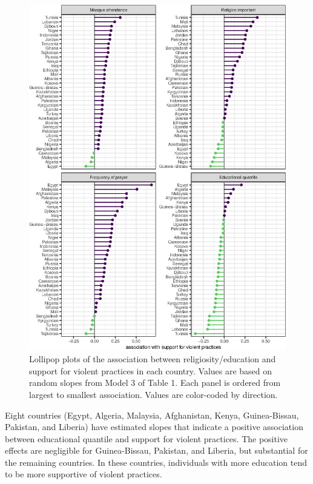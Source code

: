 \documentclass[10pt,letterpaper]{article}
\begin{document}
\begin{figure}[H]
\centering
\includegraphics{figures/fig3.eps}
\caption{Lollipop plots of the association between religiosity/education and support for violent practices in each country. Values are based on random slopes from Model 3 of Table 1. Each panel is ordered from largest to smallest association. Values are color-coded by direction.}
\label{fig:random-slope-lollipop}
\end{figure}

Eight countries (Egypt, Algeria, Malaysia, Afghanistan, Kenya, Guinea-Bissau, Pakistan, and Liberia) have estimated slopes that indicate a positive association between educational quantile and support for violent practices. The positive effects are negligible for Guinea-Bissau, Pakistan, and Liberia, but substantial for the remaining countries. In these countries, individuals with more education tend to be more supportive of violent practices.
\end{document}
